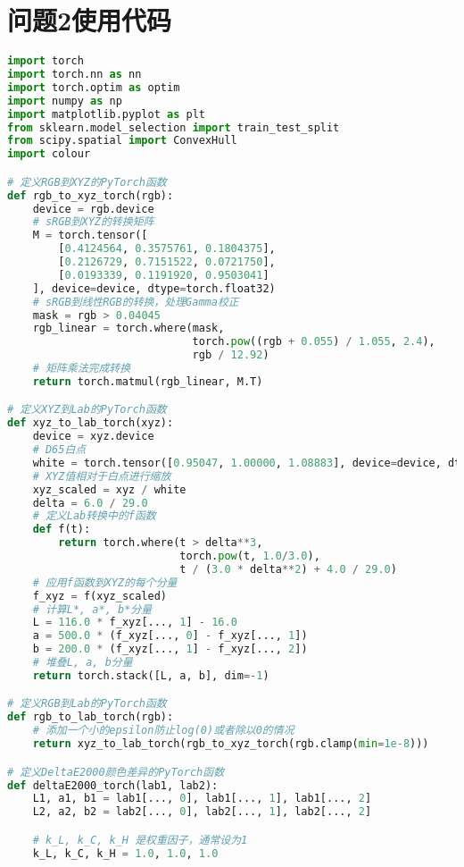 \section[\hspace{-2pt}问题2使用代码]{{\heiti{} \hspace{-8pt}问题2使用代码}}
\begin{lstlisting}[language=Python]
import torch
import torch.nn as nn
import torch.optim as optim
import numpy as np
import matplotlib.pyplot as plt
from sklearn.model_selection import train_test_split
from scipy.spatial import ConvexHull
import colour

# 定义RGB到XYZ的PyTorch函数
def rgb_to_xyz_torch(rgb):
    device = rgb.device
    # sRGB到XYZ的转换矩阵
    M = torch.tensor([
        [0.4124564, 0.3575761, 0.1804375],
        [0.2126729, 0.7151522, 0.0721750],
        [0.0193339, 0.1191920, 0.9503041]
    ], device=device, dtype=torch.float32)
    # sRGB到线性RGB的转换，处理Gamma校正
    mask = rgb > 0.04045
    rgb_linear = torch.where(mask,
                             torch.pow((rgb + 0.055) / 1.055, 2.4),
                             rgb / 12.92)
    # 矩阵乘法完成转换
    return torch.matmul(rgb_linear, M.T)

# 定义XYZ到Lab的PyTorch函数
def xyz_to_lab_torch(xyz):
    device = xyz.device
    # D65白点
    white = torch.tensor([0.95047, 1.00000, 1.08883], device=device, dtype=torch.float32)
    # XYZ值相对于白点进行缩放
    xyz_scaled = xyz / white
    delta = 6.0 / 29.0
    # 定义Lab转换中的f函数
    def f(t):
        return torch.where(t > delta**3,
                           torch.pow(t, 1.0/3.0),
                           t / (3.0 * delta**2) + 4.0 / 29.0)
    # 应用f函数到XYZ的每个分量
    f_xyz = f(xyz_scaled)
    # 计算L*, a*, b*分量
    L = 116.0 * f_xyz[..., 1] - 16.0
    a = 500.0 * (f_xyz[..., 0] - f_xyz[..., 1])
    b = 200.0 * (f_xyz[..., 1] - f_xyz[..., 2])
    # 堆叠L, a, b分量
    return torch.stack([L, a, b], dim=-1)

# 定义RGB到Lab的PyTorch函数
def rgb_to_lab_torch(rgb):
    # 添加一个小的epsilon防止log(0)或者除以0的情况
    return xyz_to_lab_torch(rgb_to_xyz_torch(rgb.clamp(min=1e-8)))

# 定义DeltaE2000颜色差异的PyTorch函数
def deltaE2000_torch(lab1, lab2):
    L1, a1, b1 = lab1[..., 0], lab1[..., 1], lab1[..., 2]
    L2, a2, b2 = lab2[..., 0], lab2[..., 1], lab2[..., 2]

    # k_L, k_C, k_H 是权重因子，通常设为1
    k_L, k_C, k_H = 1.0, 1.0, 1.0


\end{lstlisting}
